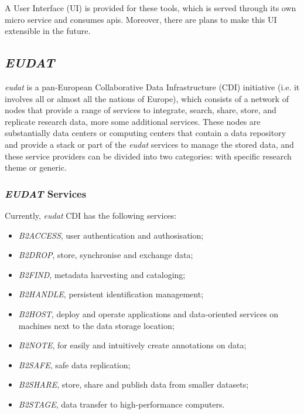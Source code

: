 A User Interface (UI) is provided for these tools, which is served through its own micro service and consumes \gls{api}s. Moreover, there are plans to make this UI extensible in the future.
  
\subsection{\textit{EUDAT}}
  
\textit{\gls{eudat}} is a pan-European Collaborative Data Infrastructure (CDI) initiative (i.e. it involves all or almost all the nations of Europe), which consists of a network of nodes that provide a range of services to integrate, search, share, store, and replicate research data, more some additional services. These nodes are substantially data centers or computing centers that contain a data repository and provide a stack or part of the \textit{\gls{eudat}} services to manage the stored data, and these service providers can be divided into two categories: with specific research theme or generic.
  
\subsubsection{\textit{EUDAT} Services}

Currently, \textit{\gls{eudat}} CDI has the following services:
  
\begin{itemize}
  \item \textit{B2ACCESS}, user authentication and authosisation;
  \item \textit{B2DROP}, store, synchronise and exchange data;
  \item \textit{B2FIND}, metadata harvesting and cataloging;
  \item \textit{B2HANDLE}, persistent identification management;
  \item \textit{B2HOST}, deploy and operate applications and data-oriented services on machines next to the data storage location;
  \item \textit{B2NOTE}, for easily and intuitively create annotations on data;
  \item \textit{B2SAFE}, safe data replication;
  \item \textit{B2SHARE}, store, share and publish data from smaller datasets;
  \item \textit{B2STAGE}, data transfer to high-performance computers.
\end{itemize}
  
